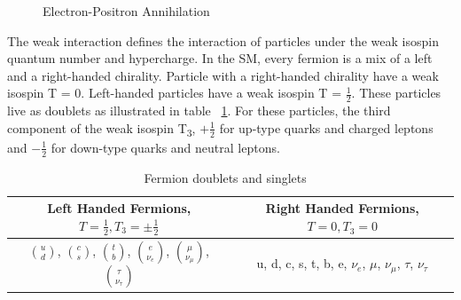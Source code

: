 \begin{figure}[h]
\begin{center}
\caption[Electron-Positron Annihilation]{Electron-Positron Annihilation}
\label{Fey:e-p}
\end{center}
\end{figure}

\indent The weak interaction defines the interaction of particles under the weak isospin quantum number and hypercharge. In the SM, every fermion is a mix of a left and a right-handed chirality. Particle with a right-handed chirality have a weak isospin T = 0. Left-handed particles have a weak isospin T =  ${\frac{1}{2}}$. These particles live as doublets as illustrated in table ~\ref{tab:chiral}. For these particles, the third component of the weak isospin T\textsubscript{3}, ${+\frac{1}{2}}$ for up-type quarks and charged leptons and ${-\frac{1}{2}}$ for down-type quarks and neutral leptons.\newline %

\begin{table}[h]
\begin{center}
\def\arraystretch{1.5}
\begin{tabular}[h]{|c|c|}
\hline
Left Handed Fermions, ${T = \frac{1}{2}, T_{3} = \pm\frac{1}{2}}$ & Right Handed Fermions, ${T = 0, T_{3} = 0}$\\
\hline\hline
${\binom{u}{d}}$, ${\binom{c}{s}}$, ${\binom{t}{b}}$, ${\binom{e}{\nu_{e}}}$, ${\binom{\mu}{\nu_{\mu}}}$, ${\binom{\tau}{\nu_{\tau}}}$ & u, d, c, s, t, b, e, ${\nu_{e}}$, ${\mu}$, ${\nu_{\mu}}$, ${\tau}$, ${\nu_{\tau}}$ \\
\hline
\end{tabular}
\caption[Fermion doublets and singlets]{Fermion doublets and singlets ~\cite{Ian:2018}}
\label{tab:chiral}
\end{center}
\end{table}


